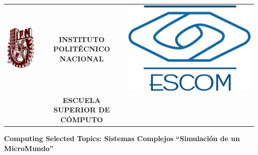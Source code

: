 \begin{titlepage}
    \begin{center}
    \begin{tabular}{r c l}
    \includegraphics[scale=.20]{images/ipn} & \textbf{INSTITUTO POLIT\'ECNICO NACIONAL} & \includegraphics[scale=.20]{images/escom}\\
    & \textbf{ESCUELA SUPERIOR DE C\'OMPUTO}
    \end{tabular}
    \end{center}


    \vspace{1.5cm}
    \begin{center}


    \textbf{Computing Selected Topics:  Sistemas Complejos} \linebreak
    \large \textbf{``Simulación de un MicroMundo''} \linebreak


\end{center}
\end{titlepage}
